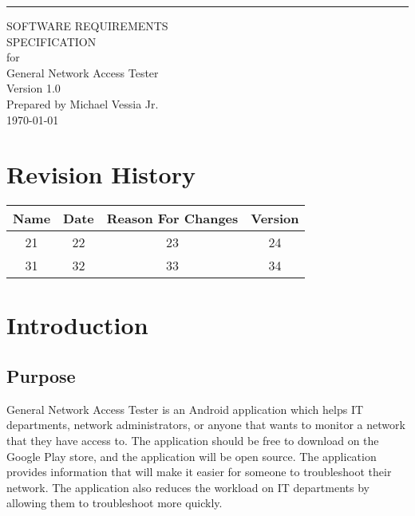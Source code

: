 \documentclass{scrreprt}
\date{}
\def\version{1.0}
\def\author{Michael Vessia Jr.}
\begin{document}
\begin{flushright}
  \rule{16cm}{5pt}\vskip1cm
  \begin{bfseries}
    \Huge{SOFTWARE REQUIREMENTS\\ SPECIFICATION}\\
    \vspace{1.9cm}
    for\\
    \vspace{1.9cm}
    General Network Access Tester\\
    \vspace{1.9cm}
    \LARGE{Version \version}\\
    \vspace{1.9cm}
    Prepared by \author\\
    \vspace{1.9cm}
    \today\\
  \end{bfseries}
\end{flushright}

\tableofcontents

\chapter*{Revision History}

\begin{center}
  \begin{tabular}{|c|c|c|c|}
    \hline
    Name & Date & Reason For Changes & Version\\
    \hline
    21 & 22 & 23 & 24\\
    \hline
    31 & 32 & 33 & 34\\
    \hline
  \end{tabular}
\end{center}

\chapter{Introduction}

\section{Purpose}

General Network Access Tester is an Android application which helps IT departments, network administrators, or anyone that wants to monitor a network that they have access to. The application should be free to download on the Google Play store, and the application will be open source. The application provides information that will make it easier for someone to troubleshoot their network.  The application also reduces the workload on IT departments by allowing them to troubleshoot more quickly.
\end{document}
